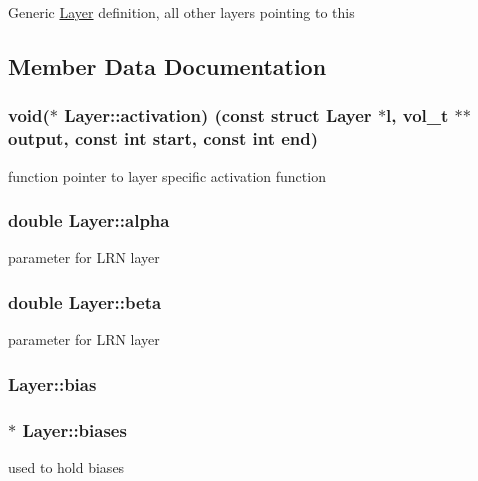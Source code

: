 Generic \hyperlink{structLayer}{Layer} definition, all other layers pointing to this 

\subsection{Member Data Documentation}
\subsubsection[{activation}]{\setlength{\rightskip}{0pt plus 5cm}void($\ast$ Layer\+::activation) (const struct {\bf Layer} $\ast$l, {\bf vol\+\_\+t} $\ast$$\ast$output, const int {\bf start}, const int {\bf end})}\hypertarget{structLayer_ac500ea4fc58b3660b90a809a7a8e037a}{}\label{structLayer_ac500ea4fc58b3660b90a809a7a8e037a}
function pointer to layer specific activation function 
\subsubsection[{alpha}]{\setlength{\rightskip}{0pt plus 5cm}double Layer\+::alpha}\hypertarget{structLayer_a4d732673af28831874e279bdfaf7c44d}{}\label{structLayer_a4d732673af28831874e279bdfaf7c44d}
parameter for L\+RN layer 
\subsubsection[{beta}]{\setlength{\rightskip}{0pt plus 5cm}double Layer\+::beta}\hypertarget{structLayer_a30224d5e092e8740c22780a4dbeab06d}{}\label{structLayer_a30224d5e092e8740c22780a4dbeab06d}
parameter for L\+RN layer 
\subsubsection[{bias}]{ Layer\+::bias}\hypertarget{structLayer_a2aa2297fa35dc56c6d03a10a3402067e}{}\label{structLayer_a2aa2297fa35dc56c6d03a10a3402067e}
\subsubsection[{biases}]{$\ast$ Layer\+::biases}\hypertarget{structLayer_a670fe0bf57a84b104338661beb82a27c}{}\label{structLayer_a670fe0bf57a84b104338661beb82a27c}
used to hold biases 
